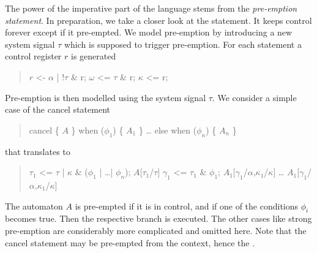 The power of the imperative part of the language stems from the \emph{pre-emption statement}. In preparation, we take a closer look at the  statement. It keeps control forever except if it pre-empted. We model pre-emption by introducing a new system signal $\tau$ which is supposed to trigger pre-emption. For each  statement a control register $r$ is generated

\begin{quote}
\BEP
    $r$ <- $\alpha$ | !$\tau$ \& r;
    $\omega$ <= $\tau$ \& r;
    $\kappa$ <= r;

\EEP
\end{quote}
Pre-emption is then modelled using the system signal $\tau$. We consider a simple case of the cancel statement
\begin{quote}
\BEP
    cancel \{
       $A$
    \} when ($\phi_{1}$) \{ $A_{1}$ \}
       \ldots
       else when ($\phi_{n}$) \{ $A_{n}$ \}    
\EEP
\end{quote}
that translates to
\begin{quote}
\BEP
    $\tau_{1}$ <= $\tau$ | $\kappa$ \& ($\phi_{1}$ | \ldots | $\phi_{n}$);
    $A$[$\tau_{1}$/$\tau$]
    $\gamma_{1}$ <= $\tau_{1}$ \& $\phi_{1}$;
    $A_{1}$[$\gamma_{1}$/$\alpha$,$\kappa_{1}$/$\kappa$]
    \ldots
    $A_{1}$[$\gamma_{1}$/$\alpha$,$\kappa_{1}$/$\kappa$]
\EEP
\end{quote}
The automaton $A$ is pre-empted if it is in control, and if one of the conditions $\phi_{i}$ becomes true. Then the respective branch is executed. The other cases like strong pre-emption are considerably more complicated and omitted here. Note that the cancel statement may be pre-empted from the context, hence the \pp{$\tau$ | \ldots}.

